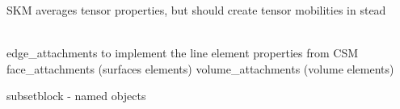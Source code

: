 \begin{DoxyRefList}
\label{todo__todo000236}%
%
SKM averages tensor properties, but should create tensor mobilities in stead  
\item[Member \doxylink{classcsmp_1_1_u_g4___u_g_x___file_export_a8856f9c2c2d529d91f53c8d3b38ace94}{csmp\+::UG4\+\_\+\+UGX\+\_\+\+File\+Export\texorpdfstring{$<$}{<} dim \texorpdfstring{$>$}{>}\+::Write\+\_\+\+UGX\+\_\+\+File\+ASCII} (const \doxylink{classcsmp_1_1_model}{Model$<$ dim $>$} \&, const std\+::string \&file\+\_\+name)]\hfill \\
\label{todo__todo000127}%
%
edge\+\_\+attachments to implement the line element properties from CSM face\+\_\+attachments (surfaces elements) volume\+\_\+attachments (volume elements)

\label{todo__todo000128}%
%
subsetblock -\/  named objects 




\end{DoxyRefList}
